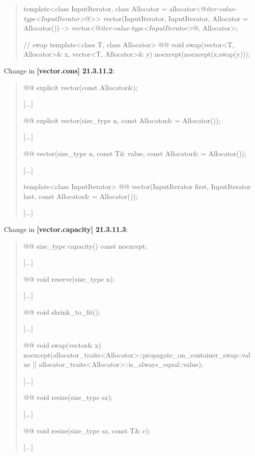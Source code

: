 \documentclass{wg21}
\begin{document}
\begin{quote}
\begin{codeblock}
{  template<class InputIterator,
           class Allocator = allocator<@\textit{iter-value-type<InputIterator>}@>>
    vector(InputIterator, InputIterator, Allocator = Allocator())
      -> vector<@\textit{iter-value-type<InputIterator>}@, Allocator>;

  // swap
  template<class T, class Allocator>
    @@ void swap(vector<T, Allocator>& x, vector<T, Allocator>& y)
      noexcept(noexcept(x.swap(y)));
}
\end{codeblock}%
\end{quote}

Change in \textbf{[vector.cons] 21.3.11.2}:
\begin{quote}
\begin{itemdecl}
@@ explicit vector(const Allocator&);
\end{itemdecl}
[...]
\begin{itemdecl}
@@ explicit vector(size_type n, const Allocator& = Allocator());
\end{itemdecl}
[...]
\begin{itemdecl}
@@ vector(size_type n, const T& value,
                           const Allocator& = Allocator());
\end{itemdecl}
[...]
\begin{itemdecl}
template<class InputIterator>
  @@ vector(InputIterator first, InputIterator last,
                             const Allocator& = Allocator());
\end{itemdecl}
[...]
\end{quote}

Change in \textbf{[vector.capacity] 21.3.11.3}:
\begin{quote}
\begin{itemdecl}
@@ size_type capacity() const noexcept;
\end{itemdecl}
[...]
\begin{itemdecl}
@@ void reserve(size_type n);
\end{itemdecl}
[...]
\begin{itemdecl}
@@ void shrink_to_fit();
\end{itemdecl}
[...]
\begin{itemdecl}
@@ void swap(vector& x)
  noexcept(allocator_traits<Allocator>::propagate_on_container_swap::value ||
           allocator_traits<Allocator>::is_always_equal::value);
\end{itemdecl}
[...]
\begin{itemdecl}
@@ void resize(size_type sz);
\end{itemdecl}
[...]
\begin{itemdecl}
@@ void resize(size_type sz, const T& c);
\end{itemdecl}
[...]
\end{quote}
\end{document}
